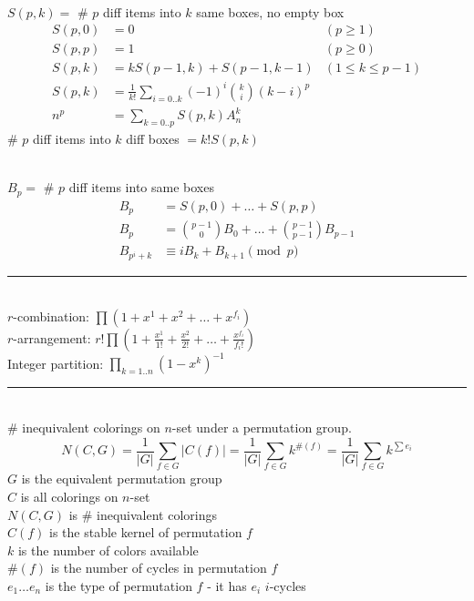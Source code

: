 \documentclass[10pt,landscape]{article}
\begin{document}
 \\ $S(p,k) =$ \# $p$ diff items into $k$ same boxes, no empty box
\begin{align*}
	S(p,0) &= 0 & (p \ge 1) \\
	S(p,p) &= 1 & (p \ge 0) \\
	S(p,k) &= k S(p-1,k) + S(p-1,k-1) & (1 \le k \le p-1) \\
	S(p,k) &= \frac{1}{k!} \sum_{i = 0..k}{(-1)^i \binom{k}{i} (k-i)^p} \\
	n^p &= \sum_{k = 0..p}{S(p,k) A_n^k}
\end{align*}
\# $p$ diff items into $k$ diff boxes $= k! S(p,k)$

 \\ $B_p =$ \# $p$ diff items into same boxes
\begin{align*}
	B_p &= S(p,0) + \hdots + S(p,p) \\
	B_p &= \binom{p-1}{0} B_0 + \hdots + \binom{p-1}{p-1} B_{p-1} \\
	B_{p^i+k} &\equiv i B_k + B_{k+1} \pmod{p}
\end{align*}

\noindent\rule{\linewidth}{1pt}

 \\ %
$r$-combination: $\prod{(1 + x^1 + x^2 + \hdots + x^{f_i})}$ \\
$r$-arrangement: $r! \prod{(1 + \frac{x^1}{1!} + \frac{x^2}{2!} + \hdots + \frac{x^{f_i}}{f_i!})}$ \\
Integer partition: $\prod_{k = 1..n}{(1-x^k)^{-1}}$

\noindent\rule{\linewidth}{1pt}

 \\
\# inequivalent colorings on $n$-set under a permutation group. 
\begin{equation*}
	N(C,G) = \frac{1}{|G|} \sum_{f \in G}{|C(f)|} = \frac{1}{|G|} \sum_{f \in G}{k^{\#(f)}} = \frac{1}{|G|} \sum_{f \in G}{k^{\sum{e_i}}}
\end{equation*}
$G$ is the equivalent permutation group \\
$C$ is all colorings on $n$-set \\
$N(C,G)$ is \# inequivalent colorings \\
$C(f)$ is the stable kernel of permutation $f$ \\
$k$ is the number of colors available \\
$\#(f)$ is the number of cycles in permutation $f$ \\
$e_1 \hdots e_n$ is the type of permutation $f$ - it has $e_i$ $i$-cycles 
\end{document}
